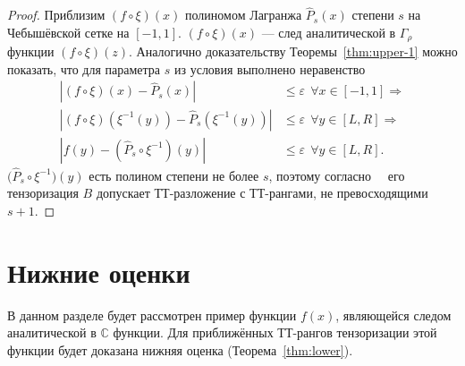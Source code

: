 \documentclass[3p]{cmmp}%
\numberwithin{equation}{section}
\begin{document}
\begin{proof}
	Приблизим $(f \circ \xi)(x)$ полиномом Лагранжа $\widehat{P}_s(x)$ степени $s$ на Чебышёвской сетке на $[-1,1]$.
	$(f \circ \xi)(x)$ --- след аналитической в $\Gamma_{\rho}$ функции $(f \circ \xi)(z)$.
	Аналогично доказательству Теоремы~\ref{thm:upper-1} можно показать, что для параметра $s$ из условия выполнено неравенство
	\begin{align*}
	\left|(f \circ \xi)(x) - \widehat{P}_s(x)\right| &\leq \varepsilon~~\forall x \in [-1,1]
	\Rightarrow \\
	\left|(f \circ \xi)\left(\xi^{-1}(y)\right) - \widehat{P}_s\left(\xi^{-1}(y)\right)\right| &\leq \varepsilon~~\forall y \in [L,R]
	\Rightarrow \\
	\left|f(y)-\left(\widehat{P}_s \circ \xi^{-1}\right)(y)\right| &\leq \varepsilon~~\forall y \in [L, R].
	\end{align*}
	$\bigl(\widehat{P}_s \circ \xi^{-1}\bigr)(y)$ есть полином степени не более $s$, поэтому согласно~~\cite{Khoromskij2011,Grasedyck2010} его тензоризация $B$ допускает ТТ-разложение с ТТ-рангами, не превосходящими $s + 1$.
\end{proof}
\section{Нижние оценки}
В данном разделе будет рассмотрен пример функции $f(x)$, являющейся следом аналитической в $\mathbb{C}$ функции.
Для приближённых ТТ-рангов тензоризации этой функции будет доказана нижняя оценка (Теорема~\ref{thm:lower}).
\end{document}
